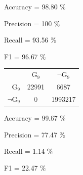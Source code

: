 Accuracy = 98.80 \%

Precision = 100 \%

Recall = 93.56 \%

F1 = 96.67 \%

\begin{tabular}{|r|c|c|}
\hline
& G$_{9}$ & $\neg$G$_{9}$ \\
G$_{9}$ & 22991 & 6687 \\
$\neg$G$_{9}$ & 0 & 1993217 \\
\hline
\end{tabular}

Accuracy = 99.67 \%

Precision = 77.47 \%

Recall = 1.14 \%

F1 = 22.47 \%
